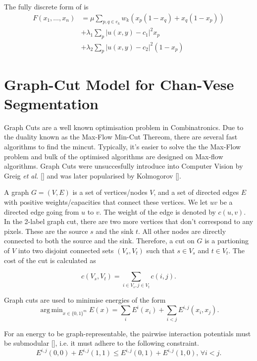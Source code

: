 \documentclass[10pt, journal, letterpaper, onecolumn, draftcls]{IEEEtran}
\DeclareMathOperator*{\argmin}{arg\,min}
\begin{document}
The fully discrete form of  is
\begin{equation}
	\begin{split}
	F(x_1, \ldots, x_n) & = \mu \sum_{p,q \in e_k} w_k( x_p(1-x_q) + x_q(1-x_p)) \\
	& + \lambda_1 \sum_p |u(x,y)-c_1|^2x_p \\
	& + \lambda_2 \sum_p |u(x,y)-c_2|^2(1-x_p)
	\end{split}
	\label{eq:discretemumfordshah}
\end{equation}

\section{Graph-Cut Model for Chan-Vese Segmentation}
\label{sec:CVgraphcut}
Graph Cuts are a well known optimisation problem in Combinatronics. Due to the duality known as the Max-Flow Min-Cut Thereom, there are several fast algorithms to find the mincut. Typically, it's easier to solve the the Max-Flow problem and bulk of the optimised algorithms are designed on Max-flow algorithms. Graph Cuts were unsuccesfully introduce into Computer Vision by Greig \textit{et al.} [] and was later popularised by Kolmogorov [].

A graph $G=(V, E)$ is a set of vertices/nodes $V$, and a set of directed edges $E$ with positive weights/capacities that connect these vertices. We let $uv$ be a directed edge going from $u$ to $v$. The weight of the edge is denoted by $c(u, v)$. In the 2-label graph cut, there are two more vertices that don't correspond to any pixels. These are the source $s$ and the sink $t$. All other nodes are directly connected to both the source and the sink. Therefore, a cut on $G$ is a partioning of $V$ into two disjoint connected sets $(V_s, V_t)$ such that $s \in V_s$ and $t \in V_t$. The cost of the cut is calculated as

\begin{equation}
	c(V_s, V_t) = \sum_{i \in V_s, j \in V_t}c(i, j).
\end{equation}

Graph cuts are used to minimise energies of the form
\begin{equation}
	\argmin_{x \in \{0,1\}^m}	E(x) = \sum_i E^i(x_i) + \sum_{i<j}E^{i,j}(x_i, x_j).
	\label{eq:graphcutenergyform}
\end{equation}

For an energy to be graph-representable, the pairwise interaction potentials must be submodular [], i.e. it must adhere to the following constraint.
\begin{equation}
	E^{i,j}(0,0) + E^{i,j}(1,1) \leq E^{i,j}(0,1) + E^{i,j}(1,0), \, \forall i < j.
\end{equation}
\end{document}
